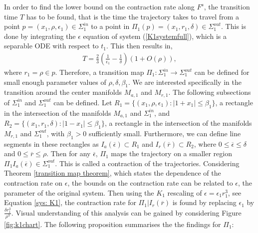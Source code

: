 In order to find the lower bound on the contraction rate along $F^s$, the transition time $T$  has to be found, that is the time the trajectory takes to travel from a point $p= (x_1, \rho, \epsilon_1)  \in \Sigma^{in}_1$ to a point in $\Pi_1(p)=( x_1, r_1, \delta) \in \Sigma^{out}_1$. This is done by integrating the $\epsilon$ equation of system (\ref{K1systemfull}), which is a separable ODE with respect to $t_1$.
This then results in, 
\begin{align*}
T= \frac{2}{3} \left(\frac{1}{\epsilon_1} - \frac{1}{\delta} \right) \left( 1 + O(\rho) \right),
\end{align*}
where $r_1= \rho \in p$. 
Therefore, a transition map $\Pi_1: \Sigma^{in}_1 \to \Sigma^{out}_1$ can be defined for small enough parameter values of $\rho, \delta, \beta_1$. We are interested specifically in the transition around the center manifolds $M_{a,1}$ and $M_{r,1}$. The following subsections of $\Sigma^{in}_1 $ and $ \Sigma^{out}_1$ can be defined. Let $R_1= \{ (x_1, \rho, \epsilon_1) : |1+ x_1| \leq \beta_1 \}$, a rectangle in the intersection of the manifolds $M_{a,1}$ and  $\Sigma^{in}_1 $, and $R_2= \{ (x_1, r_1, \delta) : |1- x_1| \leq \beta_1 \}$, a rectangle in the intersection of the manifolds $M_{r,1}$ and  $\Sigma^{out}_1 $, with $\beta_1 >0$ sufficiently small. 
Furthermore, we can define line segments in these rectangles as $I_a(\overline{\epsilon}) \subset R_1$ and $I_r(\overline{r}) \subset R_2$, where $0 \leq \overline{\epsilon} \leq \delta$ and $0 \leq \overline{r} \leq \rho$.
Then for any $\overline{\epsilon}$, $\Pi_1$ maps the trajectory on a smaller region $\Pi_1 { I_a(\overline{\epsilon})} \in  \Sigma^{out}_1 $. This is called a contraction of the trajectories.
Considering Theorem \ref{transition map theorem}, which states the dependence of the contraction rate on $\epsilon$, the bounds on the contraction rate can be related to $\epsilon$, the parameter of the original system. Then using the $K_1$ rescaling of $\epsilon= \epsilon_1 r_1^3$, see Equation \ref{sys: K1},  the contraction rate for $\Pi_1 |I_r(\overline{r})$ is found by replacing $\epsilon_1$ by $\frac{\delta r^3_1}{\rho^3}$. 
Visual understanding of this analysis can be gained by considering Figure \ref{fig:k1chart}.
The following proposition summarises the the findings for $\Pi_1$:
